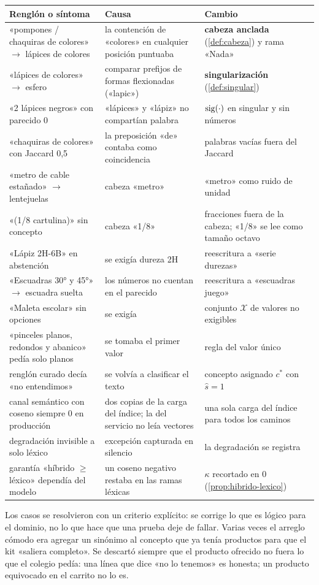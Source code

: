 \begin{evolucion}[: resolución]
\small
\begin{tabular}{@{}L{3.3cm}L{3.9cm}L{5.7cm}@{}}
\toprule
Renglón o síntoma & Causa & Cambio \\
\midrule
«pompones / chaquiras de colores» $\to$ lápices de colores &
la contención de «colores» en cualquier posición puntuaba &
\textbf{cabeza anclada} (\cref{def:cabeza}) y rama «Nada» \\
«lápices de colores» $\to$ esfero &
comparar prefijos de formas flexionadas («lapic») &
\textbf{singularización} (\cref{def:singular}) \\
«2 lápices negros» con parecido 0 &
«lápices» y «lápiz» no compartían palabra &
$\operatorname{sig}(\cdot)$ en singular y sin números \\
«chaquiras de colores» con Jaccard 0,5 &
la preposición «de» contaba como coincidencia &
palabras vacías fuera del Jaccard \\
«metro de cable estañado» $\to$ lentejuelas &
cabeza «metro» &
«metro» como ruido de unidad \\
«(1/8 cartulina)» sin concepto &
cabeza «1/8» &
fracciones fuera de la cabeza; «1/8» se lee como tamaño octavo \\
«Lápiz 2H-6B» en abstención &
se exigía dureza 2H &
reescritura a «serie durezas» \\
«Escuadras 30° y 45°» $\to$ escuadra suelta &
los números no cuentan en el parecido &
reescritura a «escuadras juego» \\
«Maleta escolar» sin opciones &
se exigía  &
conjunto $\mathcal{X}$ de valores no exigibles \\
«pinceles planos, redondos y abanico» pedía solo planos &
se tomaba el primer valor &
regla del valor único \\
renglón curado decía «no entendimos» &
se volvía a clasificar el texto &
concepto asignado $c^\ast$ con $\hat s=1$ \\
canal semántico con coseno siempre 0 en producción &
dos copias de la carga del índice; la del servicio no leía vectores &
una sola carga del índice para todos los caminos \\
degradación invisible a solo léxico &
excepción capturada en silencio &
la degradación se registra \\
garantía «híbrido $\geq$ léxico» dependía del modelo &
un coseno negativo restaba en las ramas léxicas &
$\kappa$ recortado en 0 (\cref{prop:hibrido-lexico}) \\
\bottomrule
\end{tabular}

\medskip
Los casos se resolvieron con un criterio explícito: se corrige lo que es
lógico para el dominio, no lo que hace que una prueba deje de fallar. Varias
veces el arreglo cómodo era agregar un sinónimo al concepto que ya tenía
productos para que el kit «saliera completo». Se descartó siempre que el
producto ofrecido no fuera lo que el colegio pedía: una línea que dice «no lo
tenemos» es honesta; un producto equivocado en el carrito no lo es.
\end{evolucion}
